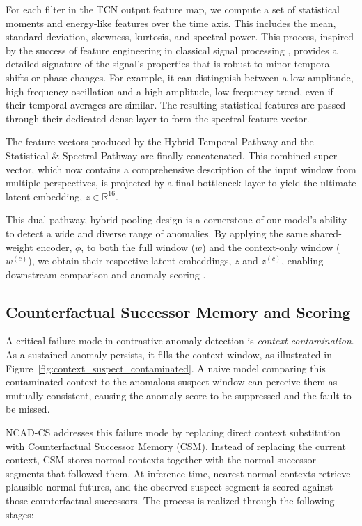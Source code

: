 \documentclass[journal]{IEEEtran}
\begin{document}
For each filter in the TCN output feature map, we compute a set of statistical moments and energy-like features over the time axis. This includes the mean, standard deviation, skewness, kurtosis, and spectral power. This process, inspired by the success of feature engineering in classical signal processing \cite{chaman2021truly}, provides a detailed signature of the signal's properties that is robust to minor temporal shifts or phase changes. For example, it can distinguish between a low-amplitude, high-frequency oscillation and a high-amplitude, low-frequency trend, even if their temporal averages are similar. The resulting statistical features are passed through their dedicated dense layer to form the spectral feature vector.

The feature vectors produced by the Hybrid Temporal Pathway and the Statistical \& Spectral Pathway are finally concatenated. This combined super-vector, which now contains a comprehensive description of the input window from multiple perspectives, is projected by a final bottleneck layer to yield the ultimate latent embedding, $z \in \mathbb{R}^{16}$.  

This dual-pathway, hybrid-pooling design is a cornerstone of our model's ability to detect a wide and diverse range of anomalies. By applying the same shared-weight encoder, $\phi$, to both the full window ($w$) and the context-only window ($w^{(c)}$), we obtain their respective latent embeddings, $z$ and $z^{(c)}$, enabling downstream comparison and anomaly scoring \cite{carmona2021neural}.

\subsection{Counterfactual Successor Memory and Scoring}
\label{subsec:successor_memory}
A critical failure mode in contrastive anomaly detection is \textit{context contamination}. As a sustained anomaly persists, it fills the context window, as illustrated in Figure~\ref{fig:context_suspect_contaminated}. A naive model comparing this contaminated context to the anomalous suspect window can perceive them as mutually consistent, causing the anomaly score to be suppressed and the fault to be missed.

NCAD-CS addresses this failure mode by replacing direct context substitution with Counterfactual Successor Memory (CSM). Instead of replacing the current context, CSM stores normal contexts together with the normal successor segments that followed them. At inference time, nearest normal contexts retrieve plausible normal futures, and the observed suspect segment is scored against those counterfactual successors. The process is realized through the following stages:
\end{document}
